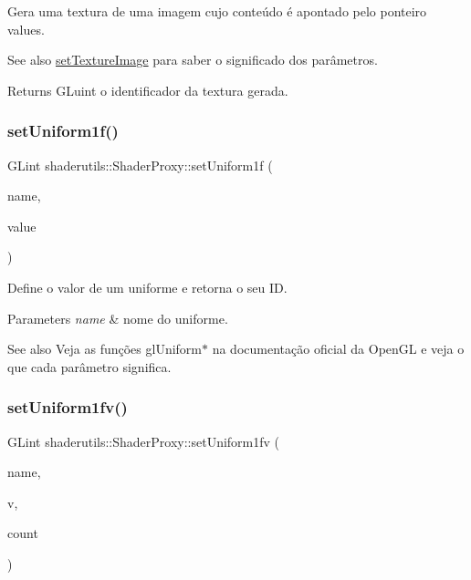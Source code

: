 Gera uma textura de uma imagem cujo conteúdo é apontado pelo ponteiro {\ttfamily values}. \begin{DoxySeeAlso}{See also}
\mbox{\hyperlink{namespaceshaderutils_a567a32c32ffab34ac65b9772152fde7a}{set\+Texture\+Image}} para saber o significado dos parâmetros. 
\end{DoxySeeAlso}
\begin{DoxyReturn}{Returns}
G\+Luint o identificador da textura gerada. 
\end{DoxyReturn}
\mbox{\label{classshaderutils_1_1_shader_proxy_ae2a00c93cb2da491f3788364a5bad14a}} 
\subsubsection{\texorpdfstring{set\+Uniform1f()}{setUniform1f()}}
{\footnotesize\ttfamily G\+Lint shaderutils\+::\+Shader\+Proxy\+::set\+Uniform1f (\begin{DoxyParamCaption}\item[{const char $\ast$}]{name,  }\item[{G\+Lfloat}]{value }\end{DoxyParamCaption})\hspace{0.3cm}{\ttfamily [inline]}}

Define o valor de um uniforme e retorna o seu ID. 
\begin{DoxyParams}{Parameters}
{\em name} & nome do uniforme. \\
\hline
\end{DoxyParams}
\begin{DoxySeeAlso}{See also}
Veja as funções gl\+Uniform$\ast$ na documentação oficial da Open\+GL e veja o que cada parâmetro significa. 
\end{DoxySeeAlso}
\mbox{\label{classshaderutils_1_1_shader_proxy_af0709f94545b3fb4f2f9e525e4c3f06c}} 
\subsubsection{\texorpdfstring{set\+Uniform1fv()}{setUniform1fv()}}
{\footnotesize\ttfamily G\+Lint shaderutils\+::\+Shader\+Proxy\+::set\+Uniform1fv (\begin{DoxyParamCaption}\item[{const char $\ast$}]{name,  }\item[{const G\+Lfloat $\ast$}]{v,  }\item[{G\+Luint}]{count }\end{DoxyParamCaption})\hspace{0.3cm}{\ttfamily [inline]}}

